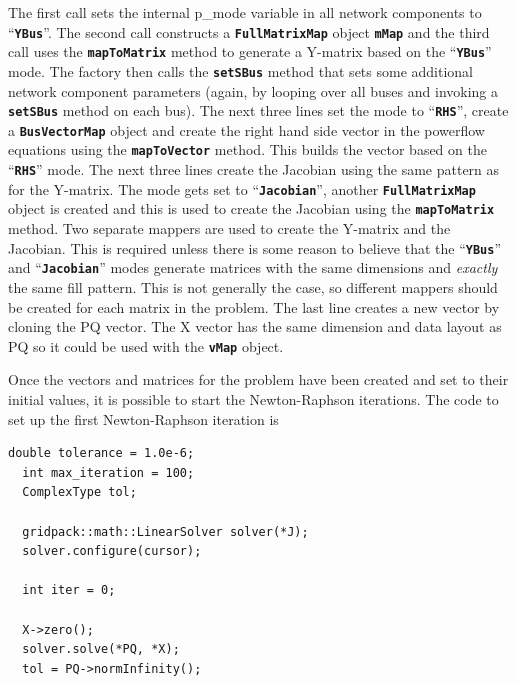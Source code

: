 The first call sets the internal p\_mode variable in all network components to ``\texttt{\textbf{YBus}}''. The second call constructs a \texttt{\textbf{FullMatrixMap}} object \texttt{\textbf{mMap}} and the third call uses the \texttt{\textbf{mapToMatrix}} method to generate a Y-matrix based on the ``\texttt{\textbf{YBus}}'' mode. The factory then calls the \texttt{\textbf{setSBus}} method that sets some additional network component parameters (again, by looping over all buses and invoking a \texttt{\textbf{setSBus}} method on each bus). The next three lines set the mode to ``\texttt{\textbf{RHS}}'', create a \texttt{\textbf{BusVectorMap}} object and create the right hand side vector in the powerflow equations using the \texttt{\textbf{mapToVector}} method. This builds the vector based on the ``\texttt{\textbf{RHS}}'' mode. The next three lines create the Jacobian using the same pattern as for the Y-matrix. The mode gets set to ``\texttt{\textbf{Jacobian}}'', another \texttt{\textbf{FullMatrixMap}} object is created and this is used to create the Jacobian using the \texttt{\textbf{mapToMatrix}} method. Two separate mappers are used to create the Y-matrix and the Jacobian. This is required unless there is some reason to believe that the ``\texttt{\textbf{YBus}}'' and ``\texttt{\textbf{Jacobian}}'' modes generate matrices with the same dimensions and \textit{exactly} the same fill pattern. This is not generally the case, so different mappers should be created for each matrix in the problem. The last line creates a new vector by cloning the PQ vector. The X vector has the same dimension and data layout as PQ so it could be used with the \texttt{\textbf{vMap}} object.

Once the vectors and matrices for the problem have been created and set to their initial values, it is possible to start the Newton-Raphson iterations. The code to set up the first Newton-Raphson iteration is

{
\color{red}
\begin{Verbatim}[fontseries=b]
  double tolerance = 1.0e-6;
  int max_iteration = 100;
  ComplexType tol;

  gridpack::math::LinearSolver solver(*J);
  solver.configure(cursor);

  int iter = 0;

  X->zero(); 
  solver.solve(*PQ, *X);
  tol = PQ->normInfinity();
\end{Verbatim}
}

